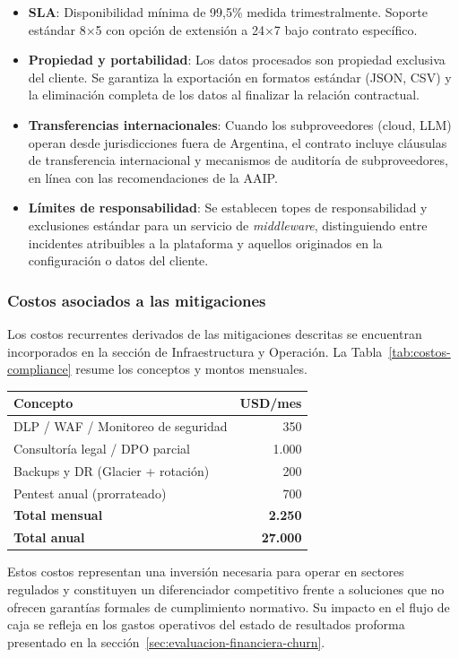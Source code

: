 \begin{itemize}
    \item \textbf{SLA}: Disponibilidad mínima de 99,5\% medida trimestralmente. Soporte estándar 8$\times$5 con opción de extensión a 24$\times$7 bajo contrato específico.
    \item \textbf{Propiedad y portabilidad}: Los datos procesados son propiedad exclusiva del cliente. Se garantiza la exportación en formatos estándar (JSON, CSV) y la eliminación completa de los datos al finalizar la relación contractual.
    \item \textbf{Transferencias internacionales}: Cuando los subproveedores (cloud, LLM) operan desde jurisdicciones fuera de Argentina, el contrato incluye cláusulas de transferencia internacional y mecanismos de auditoría de subproveedores, en línea con las recomendaciones de la AAIP.
    \item \textbf{Límites de responsabilidad}: Se establecen topes de responsabilidad y exclusiones estándar para un servicio de \textit{middleware}, distinguiendo entre incidentes atribuibles a la plataforma y aquellos originados en la configuración o datos del cliente.
\end{itemize}

\subsubsection{Costos asociados a las mitigaciones}

Los costos recurrentes derivados de las mitigaciones descritas se encuentran incorporados en la sección de Infraestructura y Operación. La Tabla~\ref{tab:costos-compliance} resume los conceptos y montos mensuales.

\begin{center}
\label{tab:costos-compliance}
\footnotesize
\begin{tabular}{lr}
\hline
\textbf{Concepto} & \textbf{USD/mes} \\
\hline
DLP / WAF / Monitoreo de seguridad & 350 \\
Consultoría legal / DPO parcial & 1.000 \\
Backups y DR (Glacier + rotación) & 200 \\
Pentest anual (prorrateado) & 700 \\
\hline
\textbf{Total mensual} & \textbf{2.250} \\
\hline
\textbf{Total anual} & \textbf{27.000} \\
\hline
\end{tabular}
\end{center}

Estos costos representan una inversión necesaria para operar en sectores regulados y constituyen un diferenciador competitivo frente a soluciones que no ofrecen garantías formales de cumplimiento normativo. Su impacto en el flujo de caja se refleja en los gastos operativos del estado de resultados proforma presentado en la sección~\ref{sec:evaluacion-financiera-churn}.